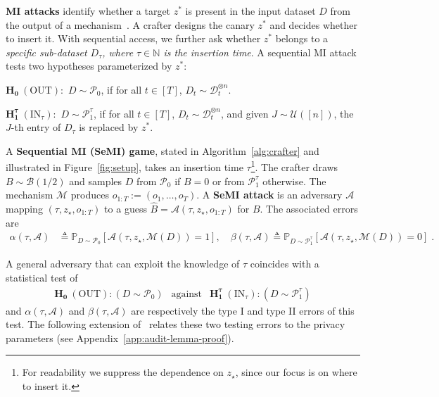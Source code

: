 \documentclass{article}
\theoremstyle{plain}
\theoremstyle{definition}
\theoremstyle{remark}
\newcommand{\cM}{\ensuremath{\mathcal{M}}}
\newcommand{\cP}{\ensuremath{\mathcal{P}}}
\newcommand{\cA}{\ensuremath{\mathcal{A}}}
\newcommand{\cD}{\ensuremath{\mathcal{D}}}
\newcommand{\cH}{\mathcal{H}}
\newcommand{\bP}{\mathbb{P}}
\begin{document}
\textbf{MI attacks} identify whether a target $z^*$ is present in the input dataset $D$ from the output of a mechanism~\citep{carlini2022membership,ye2022enhanced,leemann2023gaussian}. A crafter designs the canary $z^*$ and decides whether to insert it. With sequential access, we further ask whether $z^*$ belongs to a \textit{specific sub-dataset $D_{\tau}$, where $\tau \in \mathbb{N}$ is the insertion time}. A sequential MI attack tests two hypotheses parameterized by $z^*$:

$\mathbf{H_0}~ (\text{OUT}):$ $D \sim \cP_0$, if for all $t \in [T]$, $D_t \sim \cD_t^{\otimes n}$.

$\mathbf{H_1^{\tau}}~ (\text{IN}_{\tau}):$ $D \sim \cP_1^{\tau}$, if for all $t \in [T]$, $D_t \sim \cD_t^{\otimes n}$, and given $J \sim \mathcal{U}([n])$, the $J$-th entry of $D_{\tau}$ is replaced by $z^*$.

A \textbf{Sequential MI (SeMI) game}, stated in Algorithm~\ref{alg:crafter} and illustrated in Figure~\ref{fig:setup}, takes an insertion time $\tau$\footnote{For readability we suppress the dependence on $z_\star$, since our focus is on where to insert it.}. The crafter draws $B \sim \mathcal{B}(1/2)$ and samples $D$ from $\cP_0$ if $B=0$ or from $\cP_1^{\tau}$ otherwise. The mechanism $\cM$ produces $o_{1:T}:=(o_1,\dots,o_T)$. A \textbf{SeMI attack} is an adversary $\cA$ mapping $(\tau, z_\star, o_{1:T})$ to a guess $\widehat{B} = \cA(\tau,z_\star,o_{1:T})$ for $B$. The associated errors are
   \begin{align*}
        \alpha(\tau,\cA) & \triangleq \bP_{D \sim \cP_0}\!\left[\cA(\tau,z_\star,\cM(D)) = 1\right],      \quad
        \beta(\tau,\cA)  \triangleq \bP_{D \sim \cP_1^{\tau}}\!\left[\cA(\tau,z_\star,\cM(D)) = 0\right]\;.
    \end{align*}

A general adversary that can exploit the knowledge of $\tau$ coincides with a statistical test of
\begin{eqnarray}
    \mathbf{H_0}~(\text{OUT}): (D \sim \cP_0) \ \ \text{ against }  \ \ \mathbf{H_1^{\tau}}~(\text{IN}_{\tau}): (D \sim \cP_1^{\tau})\label{def:test_tau}
\end{eqnarray}
and $\alpha(\tau,\cA)$ and $\beta(\tau,\cA)$ are respectively the type I and type II errors of this test.
The following extension of~\cite[]{kairouz2015composition} relates these two testing errors to the privacy parameters (see Appendix~\ref{app:audit-lemma-proof}).
\end{document}
